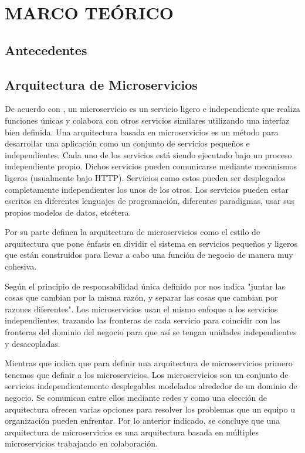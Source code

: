 \section{MARCO TEÓRICO}

\subsection{Antecedentes}

\subsection{Arquitectura de Microservicios}

De acuerdo con \cite{dmitry2014micro}, un microservicio es un servicio ligero e independiente que
realiza funciones únicas y colabora con otros servicios similares utilizando una interfaz bien definida.
Una arquitectura basada en microservicios es un método para desarrollar una aplicación como un conjunto
de servicios pequeños e independientes. Cada uno de los servicios está siendo ejecutado bajo un
proceso independiente propio. Dichos servicios pueden comunicarse mediante mecanismos ligeros (usualmente
bajo HTTP). Servicios como estos pueden ser desplegados completamente independientes los unos de los otros.
Los servicios pueden estar escritos en diferentes lenguajes de programación, diferentes paradigmas,
usar sus propios modelos de datos, etcétera.

Por su parte \cite{alshuqayran2016systematic} definen la arquitectura de microservicios como el estilo de arquitectura
que pone énfasis en dividir el sistema en servicios pequeños y ligeros que están construidos para
llevar a cabo una función de negocio de manera muy cohesiva.

Según el principio de responsabilidad única definido por \cite{martin2013clean} nos indica "juntar las
cosas que cambian por la misma razón, y separar las cosas que cambian por razones diferentes".
Los microservicios usan el mismo enfoque a los servicios independientes, trazando las fronteras
de cada servicio para coincidir con las fronteras del dominio del negocio para que así
se tengan unidades independientes y desacopladas.

Mientras que \cite{newman2019monolith} indica que para definir una arquitectura de microservicios primero tenemos que
definir a los microservicios. Los microservicios son un conjunto de servicios independientemente
desplegables modelados alrededor de un dominio de negocio. Se comunican entre ellos mediante redes
y como una elección de arquitectura ofrecen varias opciones para resolver los problemas que un
equipo u organización pueden enfrentar. Por lo anterior indicado, se concluye que una arquitectura
de microservicios es una arquitectura basada en múltiples microservicios trabajando en colaboración.

